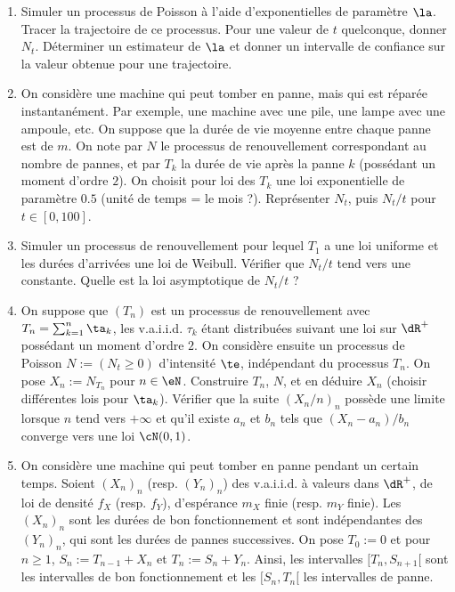 {{\begin{enumerate} 
\item Simuler un processus de Poisson à l'aide d'exponentielles de
  paramètre $\la$. Tracer la trajectoire de ce processus. Pour une
  valeur de $t$ quelconque, donner $N_t$. Déterminer un estimateur de
  $\la$ et donner un intervalle de confiance sur la valeur obtenue
  pour une trajectoire.
\item On considère une machine qui peut tomber en panne, mais qui est
  réparée instantanément. Par exemple, une machine avec une pile, une
  lampe avec une ampoule, etc. On suppose que la durée de vie moyenne
  entre chaque panne est de $m$. On note par $N$ le processus de
  renouvellement correspondant au nombre de pannes, et par $T_k$ la
  durée de vie après la panne $k$ (possédant un moment d'ordre $2$).
  On choisit pour loi des $T_k$ une loi exponentielle de paramètre
  $0.5$ (unité de temps = le mois ?). Représenter $N_t$, puis $N_t/t$
  pour $t \in [0,100]$.
\item Simuler un processus de renouvellement pour lequel $T_1$ a une
  loi uniforme et les durées d'arrivées une loi de Weibull. Vérifier
  que $N_t/t$ tend vers une constante. Quelle est la loi asymptotique
  de $N_t/t$ ?
\item On suppose que $(T_n)$ est un processus de renouvellement avec
  $T_n=\sum_{k=1}^n \ta_k$, les v.a.i.i.d. $\tau_k$ étant distribuées
  suivant une loi sur $\dR^+$ possédant un moment d'ordre $2$. On
  considère ensuite un processus de Poisson $N:=(N_t\geq 0)$
  d'intensité $\te$, indépendant du processus $T_n$. On pose
  $X_n:=N_{T_n}$ pour $n\in\eN$. Construire $T_n$, $N$, et en déduire
  $X_n$ (choisir différentes lois pour $\ta_k$).  Vérifier que la
  suite $(X_n/n)_n$ possède une limite lorsque $n$ tend vers $+\infty$
  et qu'il existe $a_n$ et $b_n$ tels que $(X_n-a_n)/b_n$ converge
  vers une loi ${\cN}(0,1)$.
\item On considère une machine qui peut tomber en panne pendant un
  certain temps. Soient $(X_n)_n$ (resp. $(Y_n)_n$) des v.a.i.i.d. à
  valeurs dans $\dR^+$, de loi de densité $f_X$ (resp. $f_Y$),
  d'espérance $m_X$ finie (resp. $m_Y$ finie). Les $(X_n)_n$ sont les
  durées de bon fonctionnement et sont indépendantes des $(Y_n)_n$,
  qui sont les durées de pannes successives.  On pose $T_0:=0$ et pour
  $n \geq 1$, $S_n:=T_{n-1}+X_n$ et $T_n:=S_n+Y_n$.  Ainsi, les
  intervalles $[T_n,S_{n+1}[$ sont les intervalles de bon
  fonctionnement et les $[S_n,T_n[$ les intervalles de panne.
  \begin{enumerate}

\end{enumerate}
\end{enumerate}}}
